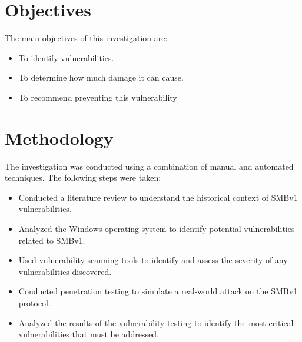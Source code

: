 \documentclass[12pt, letterpaper]{article}
\begin{document}
\section{Objectives}
The main objectives of this investigation are:
\begin{itemize}
    \item To identify vulnerabilities.
    \item To determine how much damage it can cause.
    \item To recommend preventing this vulnerability 
\end{itemize}

\newpage
\section{Methodology}
The investigation was conducted using a combination of manual and automated techniques. The following steps were taken:

\begin{itemize}
\item Conducted a literature review to understand the historical context of SMBv1 vulnerabilities.
\item Analyzed the Windows operating system to identify potential vulnerabilities related to SMBv1.
\item Used vulnerability scanning tools to identify and assess the severity of any vulnerabilities discovered.
\item Conducted penetration testing to simulate a real-world attack on the SMBv1 protocol.
\item Analyzed the results of the vulnerability testing to identify the most critical vulnerabilities that must be addressed.
\end{itemize}
\newpage
\end{document}
